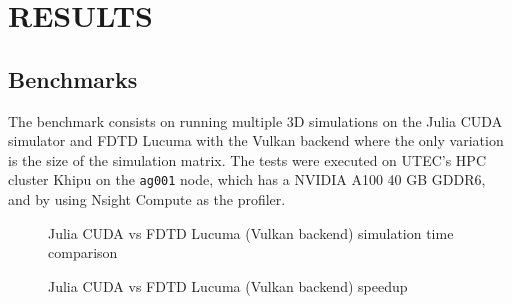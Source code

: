 \documentclass[../main.tex]{subfiles}
\begin{document}
\newpage
\chapter{RESULTS}
\label{sec:results}

\section{Benchmarks}

\BENCHMARKS


The benchmark consists on running multiple 3D simulations on the Julia CUDA simulator and FDTD Lucuma with the Vulkan backend where the only variation is the size of the simulation matrix.
The tests were executed on UTEC's HPC cluster Khipu on the \texttt{ag001} node, which has a NVIDIA A100 40 GB GDDR6, and by using Nsight Compute as the profiler.

\begin{figure}[H]
	\centering
	\caption{Julia CUDA vs FDTD Lucuma (Vulkan backend) simulation time comparison}
	\label{fig:julia_cuda_vs_vulkan}
\end{figure}

\begin{figure}[H]
	\centering
	\caption{Julia CUDA vs FDTD Lucuma (Vulkan backend) speedup}
	\label{fig:julia_cuda_vs_vulkan_speedup}
\end{figure}
\end{document}
